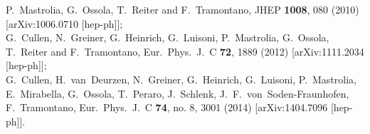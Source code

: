 \documentclass[aps,prd,preprint,groupedaddress,nofootinbib,showpacs,eqsecnum]{revtex4}
\begin{document}
\begin{thebibliography}{99}
P.~Mastrolia, G.~Ossola, T.~Reiter and F.~Tramontano,
JHEP {\bf 1008}, 080 (2010)
[arXiv:1006.0710 [hep-ph]];\\
G.~Cullen, N.~Greiner, G.~Heinrich, G.~Luisoni, P.~Mastrolia, G.~Ossola, 
T.~Reiter and F.~Tramontano,
Eur.\ Phys.\ J.\ C {\bf 72}, 1889 (2012)
[arXiv:1111.2034 [hep-ph]];\\
G.~Cullen, H.~van~Deurzen, N.~Greiner, G.~Heinrich, G.~Luisoni,
P.~Mastrolia, E.~Mirabella, G.~Ossola, T.~Peraro, J.~Schlenk, 
J.~F.~von~Soden-Fraunhofen, F.~Tramontano,
Eur.\ Phys.\ J.\ C {\bf 74}, no. 8, 3001 (2014)
[arXiv:1404.7096 [hep-ph]].


\end{thebibliography}
\end{document}
